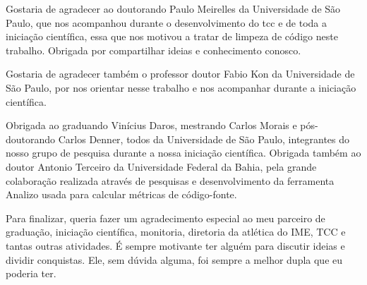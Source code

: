 \documentclass[a4paper, 11pt]{article}
\begin{document}
Gostaria de agradecer ao doutorando Paulo Meirelles da Universidade de São Paulo, que nos acompanhou durante o desenvolvimento do tcc e de toda a iniciação científica, essa que nos motivou a tratar de limpeza de código neste trabalho. Obrigada por compartilhar ideias e conhecimento conosco.

Gostaria de agradecer também o professor doutor Fabio Kon da Universidade de São Paulo, por nos orientar nesse trabalho e nos acompanhar durante a iniciação científica.

Obrigada ao graduando Vinícius Daros, mestrando Carlos Morais e pós-doutorando Carlos Denner, todos da Universidade de São Paulo, integrantes do nosso grupo de pesquisa durante a nossa iniciação científica. Obrigada também ao doutor Antonio Terceiro da Universidade Federal da Bahia, pela grande colaboração realizada através de pesquisas e desenvolvimento da ferramenta Analizo usada para calcular métricas de código-fonte. 

Para finalizar, queria fazer um agradecimento especial ao meu parceiro de graduação, iniciação científica, monitoria, diretoria da atlética do IME, TCC e tantas outras atividades. É sempre motivante ter alguém para discutir ideias e dividir conquistas. Ele, sem dúvida alguma, foi sempre a melhor dupla que eu poderia ter.                        
\end{document}
